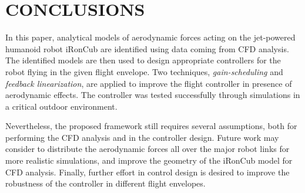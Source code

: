 \section{CONCLUSIONS}
\label{conclusion}



In this paper, analytical models of aerodynamic forces acting on the jet-powered  humanoid robot iRonCub are identified using data coming from CFD analysis. The identified models are then used to design appropriate controllers for the robot flying in the given flight envelope. %
Two techniques, \emph{gain-scheduling} and \emph{feedback linearization}, are applied to improve the flight controller in presence of aerodynamic effects. The controller was tested successfully through simulations in a critical outdoor environment.

Nevertheless, the proposed framework still requires several assumptions, both for performing the CFD analysis and in the controller design. Future work may consider to distribute the aerodynamic forces all over the major robot links for more realistic simulations, and improve the geometry of the iRonCub model for CFD analysis. Finally, further effort in control design is desired to improve the robustness of the controller in different flight envelopes.


